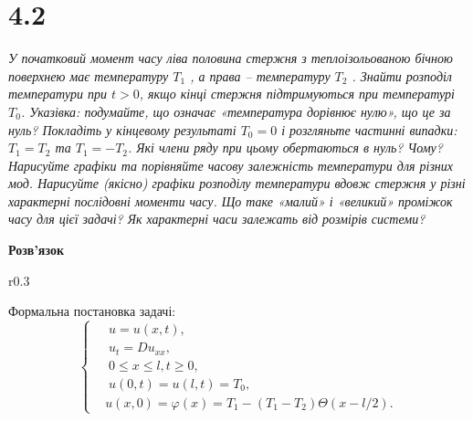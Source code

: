 

%


\section[Задача №4.2]{4.2}

\textit{У початковий момент часу ліва половина стержня з теплоізольованою бічною поверхнею має температуру $T_1$ , а права -- температуру $T_2$ . Знайти розподіл температури при $t> 0$, якщо кінці стержня підтримуються при температурі $T_0$. Указівка: подумайте, що означає «температура дорівнює нулю», що це за нуль? Покладіть у кінцевому результаті $T_0 = 0$ і розгляньте частинні випадки: $T_1 = T_2$ та $T_1 = -T_2$. Які члени ряду при цьому обертаються в нуль? Чому? Нарисуйте графіки та порівняйте часову залежність температури для     різних мод. Нарисуйте (якісно) графіки розподілу     температури вдовж стержня у різні характерні послідовні моменти часу. Що таке «малий» і «великий» проміжок часу для цієї задачі? Як характерні часи залежать від розмірів системи?}

\begin{center}
    \textbf{Розв'язок}
\end{center}

\begin{wrapfigure}{r}{0.3\textwidth}
    \centering
\end{wrapfigure}


Формальна постановка задачі:
\begin{equation} \label{probcond7}
    \left\{ \begin{aligned}
        &\;u = u(x,t), \\
        &\;u_{t} = D u_{xx}, \\
        &\;0 \leq x \leq l, t \geq 0, \\
        &\;u(0,t) = u(l,t) = T_0,\\
        &u(x,0) = \varphi(x) = T_1 - (T_1 - T_2)\Theta(x - l/2).
    \end{aligned} \right.
\end{equation}
\vspace{1cm}

